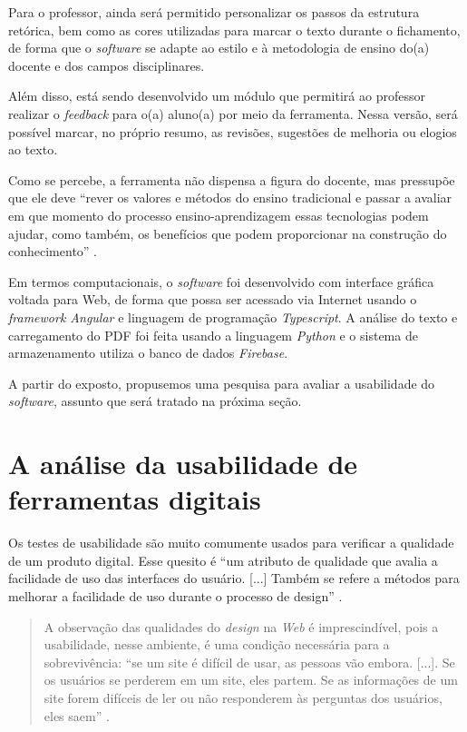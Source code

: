 \documentclass[portuguese]{textolivre}
\begin{document}
Para o professor, ainda será permitido personalizar os passos da estrutura retórica, bem como as cores utilizadas para marcar o texto durante o fichamento, de forma que o \textit{software} se adapte ao estilo e à metodologia de ensino do(a) docente e dos campos disciplinares.

Além disso, está sendo desenvolvido um módulo que permitirá ao professor realizar o \textit{feedback} para o(a) aluno(a) por meio da ferramenta. Nessa versão, será possível marcar, no próprio resumo, as revisões, sugestões de melhoria ou elogios ao texto.

Como se percebe, a ferramenta não dispensa a figura do docente, mas pressupõe que ele deve “rever os valores e métodos do ensino tradicional e passar a avaliar em que momento do processo ensino-aprendizagem essas tecnologias podem ajudar, como também, os benefícios que podem proporcionar na construção do conhecimento” \cite[p.~23]{juca2006}.

Em termos computacionais, o \textit{software} foi desenvolvido com interface gráfica voltada para Web, de forma que possa ser acessado via Internet usando o \textit{framework Angular} e linguagem de programação \textit{Typescript}. A análise do texto e carregamento do PDF foi feita usando a linguagem \textit{Python} e o sistema de armazenamento utiliza o banco de dados \textit{Firebase}.

A partir do exposto, propusemos uma pesquisa para avaliar a usabilidade do \textit{software}, assunto que será tratado na próxima seção.


\section{A análise da usabilidade de ferramentas digitais}\label{sec-formato}
Os testes de usabilidade são muito comumente usados para verificar a qualidade de um produto digital. Esse quesito é “um atributo de qualidade que avalia a facilidade de uso das interfaces do usuário. [...] Também se refere a métodos para melhorar a facilidade de uso durante o processo de design” \cite[p.~1, tradução nossa]{nielsen2012}.

\begin{quote}
    A observação das qualidades do \textit{design} na \textit{Web} é imprescindível, pois a usabilidade, nesse ambiente, é uma condição necessária para a sobrevivência: “se um site é difícil de usar, as pessoas vão embora. [...]. Se os usuários se perderem em um site, eles partem. Se as informações de um site forem difíceis de ler ou não responderem às perguntas dos usuários, eles saem” \cite[p.~2]{nielsen2012}.
\end{quote}
	
\end{document}
